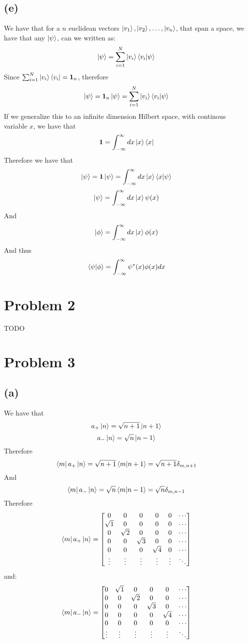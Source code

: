 \documentclass[11pt]{article}
\begin{document}
\subsection*{(e)}
We have that for a $n$ euclidean vectors $\ket{v_1},\ket{v_2},\ldots,\ket{v_n}$,
that span a space, we have that any $\ket{\psi}$, can we written 
as:
$$\ket{\psi}=\sum_{i=1}^N \ket{v_i}\bra{v_i}\ket{\psi}$$
Since $\sum_{i=1}^N \ket{v_i}\bra{v_i}= \mathbf{1}_n$, therefore 
$$\ket{\psi}=\mathbf{1}_n \ket{\psi}=\sum_{i=1}^N \ket{v_i}\bra{v_i}\ket{\psi}$$
If we generalize this to an infinite dimension Hilbert space, 
with continous variable $x$, we have that
$$\mathbf{1}= \int_{-\infty}^{\infty} dx\ket{x}\bra{x}$$
Therefore we have that 
$$\ket{\psi}=\mathbf{1}\ket{\psi}=\int_{-\infty}^{\infty} dx\ket{x}\bra{x}\ket{\psi}$$
$$\ket{\psi}=\int_{-\infty}^{\infty} dx\ket{x}\psi(x)$$
And 
$$\ket{\phi} = \int_{-\infty}^{\infty} dx\ket{x}\phi(x)$$
And thus 
$$\bra{\psi}\ket{\phi}=\int_{-\infty}^{\infty} \psi^{*}(x)\phi(x)dx$$
\section*{Problem 2}
TODO
\section*{Problem 3}
\subsection*{(a)}
We have that 
$$a_{+}\ket{n} = \sqrt{n+1}\ket{n+1}$$
$$a_{-}\ket{n} = \sqrt{n}\ket{n-1}$$
Therefore 
$$\bra{m}a_{+}\ket{n}= \sqrt{n+1}\bra{m}\ket{n+1}=
\sqrt{n+1}\delta_{m,n+1}$$
And
$$\bra{m}a_{-}\ket{n}= \sqrt{n}\bra{m}\ket{n-1}=
\sqrt{n}\delta_{m,n-1}$$
Therefore 
$$\bra{m}a_{+}\ket{n}
=\begin{bmatrix}
    0 & 0 & 0 & 0 & 0 & \cdots \\
    \sqrt{1} & 0 & 0 & 0 & 0 & \cdots \\
    0 & \sqrt{2} & 0 & 0 & 0 & \cdots \\
    0 & 0 & \sqrt{3} & 0 & 0 & \cdots \\
    0 & 0 & 0 & \sqrt{4} & 0 & \cdots \\
    \vdots & \vdots & \vdots & \vdots & \vdots & \ddots
\end{bmatrix}$$
and:
$$\bra{m}a_{-}\ket{n}
=\begin{bmatrix}
    0 & \sqrt{1} & 0 & 0 & 0 & \cdots \\
    0 & 0 & \sqrt{2} & 0 & 0 & \cdots \\
    0 & 0 & 0 & \sqrt{3} & 0 & \cdots \\
    0 & 0 & 0 & 0 & \sqrt{4} & \cdots \\
    0 & 0 & 0 & 0 & 0 & \cdots \\
    \vdots & \vdots & \vdots & \vdots & \vdots & \ddots
\end{bmatrix}$$
\end{document}
